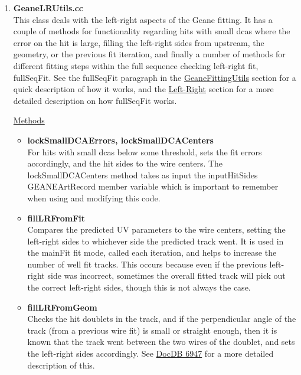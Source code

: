 \begin{enumerate}
      \item{\bf{GeaneLRUtils.cc}} \\
      \label{sec:GeaneLRUtils}
      This class deals with the left-right aspects of the Geane fitting. It has a couple of methods for functionality regarding hits with small dcas where the error on the hit is large, filling the left-right sides from upstream, the geometry, or the previous fit iteration, and finally a number of methods for different fitting steps within the full sequence checking left-right fit, fullSeqFit. See the fullSeqFit paragraph in the \hyperref[sec:GeaneFittingUtils]{GeaneFittingUtils} section for a quick description of how it works, and the \hyperref[sec:LR]{Left-Right} section for a more detailed description on how fullSeqFit works.

      \underline{Methods}

        \begin{itemize}

          \item{\bf{lockSmallDCAErrors, lockSmallDCACenters}} \\
          For hits with small dcas below some threshold, sets the fit errors accordingly, and the hit sides to the wire centers. The lockSmallDCACenters method takes as input the inputHitSides GEANEArtRecord member variable which is important to remember when using and modifying this code.

          \item{\bf{fillLRFromFit}} \\ 
          Compares the predicted UV parameters to the wire centers, setting the left-right sides to whichever side the predicted track went. It is used in the mainFit fit mode, called each iteration, and helps to increase the number of well fit tracks. This occurs because even if the previous left-right side was incorrect, sometimes the overall fitted track will pick out the correct left-right sides, though this is not always the case.

          \item{\bf{fillLRFromGeom}} \\
          Checks the hit doublets in the track, and if the perpendicular angle of the track (from a previous wire fit) is small or straight enough, then it is known that the track went between the two wires of the doublet, and sets the left-right sides accordingly. See \href{https://gm2-docdb.fnal.gov/cgi-bin/private/ShowDocument?docid=6947}{DocDB 6947} for a more detailed description of this.


\end{itemize}
\end{enumerate}
